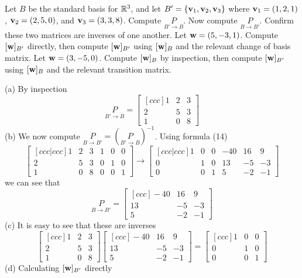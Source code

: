 \ii Let $B$ be the standard basis for ${\mathbb R}^3$, and let $B' = \{{\mathbf v}_1,{\mathbf v}_2,{\mathbf v}_3\}$ where ${\mathbf v}_1 = (1,2,1)$, ${\mathbf v}_2 = (2,5,0)$, and ${\mathbf v}_3 = (3,3,8)$. 
\bb
\ii Compute $\underset{B'\rightarrow B}{P}$. 
\ii Now compute $\underset{B\rightarrow B'}{P}$.
\ii Confirm these two matrices are inverses of one another.
\ii Let ${\mathbf w} = (5,-3,1)$. Compute $[{\mathbf w}]_{B'}$ directly, then compute $[{\mathbf w}]_{B'}$ using $[{\mathbf w}]_{B}$ and the relevant change of basis matrix. 
\ii Let ${\mathbf w} = (3,-5,0)$. Compute $[{\mathbf w}]_{B}$ by inspection, then compute $[{\mathbf w}]_{B'}$ using $[{\mathbf w}]_{B}$ and the relevant transition matrix.
\ee
\begin{solution}
\noindent 
(a) By inspection
$$
\underset{B'\rightarrow B}{P} =
\begin{bmatrix}[ccc]
1&2&3\\
2&5&3\\
1&0&8
\end{bmatrix}
$$
(b) We now compute $\underset{B\rightarrow B'}{P}=(\underset{B'\rightarrow B}{P})^{-1}$. Using formula (14)
$$
\begin{bmatrix}[ccc|ccc]
1&2&3&1&0&0\\
2&5&3&0&1&0\\
1&0&8&0&0&1
\end{bmatrix}
\rightarrow
\begin{bmatrix}[ccc|ccc]
1&0&0&-40&16&9\\
0&1&0&13&-5&-3\\
0&0&1&5&-2&-1
\end{bmatrix}
$$
we can see that
$$
\underset{B\rightarrow B'}{P}=
\begin{bmatrix}[ccc]
-40&16&9\\
13&-5&-3\\
5&-2&-1
\end{bmatrix}
$$
(c) It is easy to see that these are inverses
$$
\begin{bmatrix}[ccc]
1&2&3\\
2&5&3\\
1&0&8
\end{bmatrix}
\begin{bmatrix}[ccc]
-40&16&9\\
13&-5&-3\\
5&-2&-1
\end{bmatrix}
=
\begin{bmatrix}[ccc]
1&0&0\\
0&1&0\\
0&0&1
\end{bmatrix}
$$
(d) Calculating $[{\mathbf w}]_{B'}$ directly

\end{solution}
